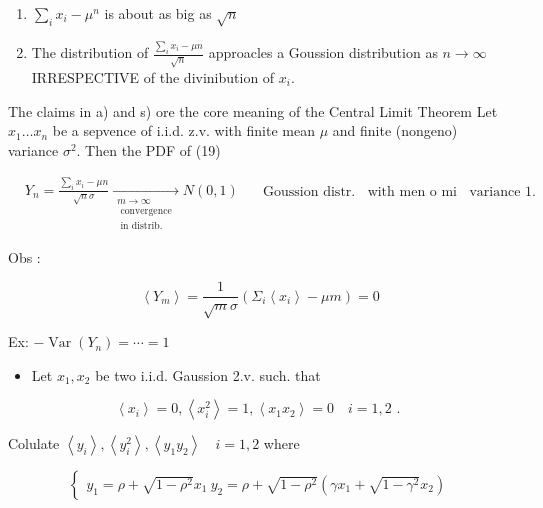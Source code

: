 \begin{enumerate}
  \item $\sum_{i} x_{i}-\mu^{n}$ is about as big as $\sqrt{n}$
  \item The distribution of $\frac{\sum_{i} x_{i}-\mu n}{\sqrt{n}}$ approacles a Goussion distribution as $n \rightarrow \infty$ IRRESPECTIVE of the divinibution of $x_{i}$.
\end{enumerate}

The claims in a) and s) ore the core meaning of the Central Limit Theorem
Let $x_{1} \ldots x_{n}$ be a sepvence of i.i.d. z.v. with finite mean $\mu$ and finite (nongeno) variance $\sigma^{2}$. Then the PDF of
(19)

$$ \begin{aligned} & Y_{n}=\frac{\sum_{i} x_{i}-\mu n}{\sqrt{n} \sigma} \xrightarrow[\begin{array}{c} m \rightarrow \infty \\ \text { convergence } \\ \text { in distrib. } \end{array}]{ } N(0,1) \quad \begin{gathered} \text { Goussion distr. } \ \text { with men o mi } \ \text { variance } 1 . \end{gathered} \end{aligned} $$ 

Obs :

$$ \left\langle Y_{m}\right\rangle=\frac{1}{\sqrt{m} \sigma}\left(\Sigma_{i}\left\langle x_{i}\right\rangle-\mu m\right)=0 $$ 

Ex:
$-\operatorname{Var}\left(Y_{n}\right)=\cdots=1$

\begin{itemize}
  \item Let $x_{1}, x_{2}$ be two i.i.d. Gaussion 2.v. such. that
\end{itemize}

$$ \left\langle x_{i}\right\rangle=0,\left\langle x_{i}^{2}\right\rangle=1,\left\langle x_{1} x_{2}\right\rangle=0 \quad i=1,2 \text { . } $$ 

Colulate $\left\langle y_{i}\right\rangle,\left\langle y_{i}^{2}\right\rangle,\left\langle y_{1} y_{2}\right\rangle \quad i=1,2$ where

$$ \left\{\begin{array}{l} y_{1}=\rho+\sqrt{1-\rho^{2}} x_{1} \ y_{2}=\rho+\sqrt{1-\rho^{2}}\left(\gamma x_{1}+\sqrt{1-\gamma^{2}} x_{2}\right) \end{array}\right. $$ 

